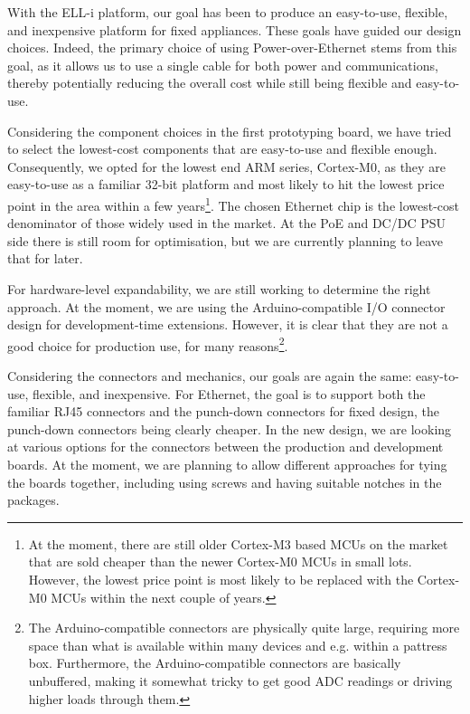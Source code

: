 \documentclass{siamltex}
\begin{document}
With the ELL-i platform, our goal has been to produce an easy-to-use,
flexible, and inexpensive platform for fixed appliances.  These goals
have guided our design choices.  Indeed, the primary choice of using
Power-over-Ethernet stems from this goal, as it allows us to use a
single cable for both power and communications, thereby potentially
reducing the overall cost while still being flexible and easy-to-use.

Considering the component choices in the first prototyping board, we
have tried to select the lowest-cost components that are easy-to-use
and flexible enough.  Consequently, we opted for the lowest end ARM
series, Cortex-M0, as they are easy-to-use as a familiar 32-bit
platform and most likely to hit the lowest price point in the area
within a few years\footnote{At the moment, there are still older
  Cortex-M3 based MCUs on the market that are sold cheaper than the
  newer Cortex-M0 MCUs in small lots.  However, the lowest price
  point is most likely to be replaced with the Cortex-M0 MCUs within
  the next couple of years.}.
The chosen Ethernet chip is the lowest-cost denominator of those
widely used in the market.  At the PoE and DC/DC PSU side there is
still room for optimisation, but we are currently planning to leave
that for later.

For hardware-level expandability, we are still working to determine
the right approach.  At the moment, we are using the Arduino-compatible I/O
connector design for development-time extensions.  However, it is
clear that they are not a good choice for production use, for many
reasons\footnote{The Arduino-compatible connectors are physically quite large,
  requiring more space than what is available within many devices and
  e.g. within a pattress box.  Furthermore, the Arduino-compatible connectors are
  basically unbuffered, making it somewhat tricky to get good ADC
  readings or driving higher loads through them.}.

Considering the connectors and mechanics, our goals are again the
same: easy-to-use, flexible, and inexpensive.  For Ethernet, the goal
is to support both the familiar RJ45 connectors and the punch-down
connectors for fixed design, the punch-down connectors being clearly
cheaper.  In the new design, we are looking at various options for the
connectors between the production and development boards.  At the
moment, we are planning to allow different approaches for tying the
boards together, including using screws and having suitable notches in
the packages.
\end{document}
